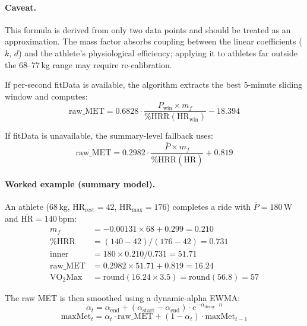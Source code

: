 \documentclass[11pt,a4paper]{article}
\begin{document}
\paragraph{Caveat.} This formula is derived from only two data points and should be treated as an approximation.
The mass factor absorbs coupling between the linear coefficients ($k$, $d$) and the athlete's physiological efficiency; applying it to athletes far outside the 68--77\,kg range may require re-calibration.

If per-second fitData is available, the algorithm extracts the best 5-minute sliding window and computes:
\begin{equation}
\text{raw\_MET} = 0.6828 \cdot \frac{P_{\text{win}} \times m_f}{\%\text{HRR}(\text{HR}_{\text{win}})} - 18.394
\label{eq:cyc-windowed}
\end{equation}

If fitData is unavailable, the summary-level fallback uses:
\begin{equation}
\text{raw\_MET} = 0.2982 \cdot \frac{\overline{P} \times m_f}{\%\text{HRR}(\overline{\text{HR}})} + 0.819
\label{eq:cyc-summary}
\end{equation}

\paragraph{Worked example (summary model).}
An athlete (68\,kg, HR$_{\text{rest}} = 42$, HR$_{\text{max}} = 176$) completes a ride with $\overline{P} = 180$\,W and $\overline{\text{HR}} = 140$\,bpm:
\begin{align*}
m_f &= -0.00131 \times 68 + 0.299 = 0.210 \\
\%\text{HRR} &= (140 - 42) / (176 - 42) = 0.731 \\
\text{inner} &= 180 \times 0.210 / 0.731 = 51.71 \\
\text{raw\_MET} &= 0.2982 \times 51.71 + 0.819 = 16.24 \\
\text{VO}_2\text{Max} &= \text{round}(16.24 \times 3.5) = \text{round}(56.8) = 57
\end{align*}

The raw MET is then smoothed using a dynamic-alpha EWMA:
\begin{equation}
\alpha_t = \alpha_{\text{end}} + (\alpha_{\text{start}} - \alpha_{\text{end}}) \cdot e^{-\alpha_{\text{decay}} \cdot n}
\label{eq:cyc-dynamic-alpha}
\end{equation}
\begin{equation}
\text{maxMet}_t = \alpha_t \cdot \text{raw\_MET} + (1 - \alpha_t) \cdot \text{maxMet}_{t-1}
\end{equation}
\end{document}

